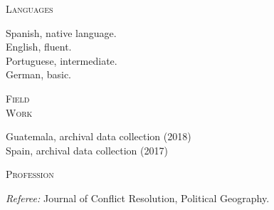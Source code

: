 \documentclass[a4paper, 11pt]{article}
\begin{document}
\vspace{20pt}


\noindent
\begin{minipage}[t]{0.14\textwidth}
  \flushleft
  \textsc{\small Languages}
\end{minipage}
\begin{minipage}[t]{0.86\textwidth}
  Spanish, native language.\\
  English, fluent.\\
  Portuguese, intermediate.\\
  German, basic.
\end{minipage}

\vspace{20pt}


\noindent
\begin{minipage}[t]{0.14\textwidth}
  \flushleft
  \textsc{\small Field\\Work}
\end{minipage}
\begin{minipage}[t]{0.86\textwidth}
  Guatemala, archival data collection (2018)\\
  Spain, archival data collection (2017)
\end{minipage}

\vspace{20pt}


\noindent
\begin{minipage}[t]{0.14\textwidth}
  \flushleft
  \textsc{\small Profession}
\end{minipage}
\begin{minipage}[t]{0.86\textwidth}
  {\it Referee:} Journal of Conflict Resolution, Political Geography.\\
\end{minipage}

\vspace{20pt}
\end{document}
